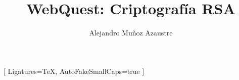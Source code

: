 \usepackage{fontspec}

\setmainfont{Times New Roman}[
  Ligatures=TeX,
  AutoFakeSmallCaps=true
]

\setmonofont{Courier New}

\usepackage[
  left=2.5cm,
  right=2.5cm,
  top=2.5cm,
  bottom=2.5cm
]{geometry}

\setlength{\headheight}{15pt}

\usepackage{setspace}
\onehalfspacing
\raggedbottom

\setlength{\parindent}{1.25cm}
\setlength{\parskip}{10pt}

\usepackage{graphicx}
\usepackage{caption}
\usepackage{float}
\usepackage{longtable}
\usepackage{array}
\usepackage{booktabs}
\usepackage[table]{xcolor}
\usepackage{tabularx}
\usepackage{multirow}
\usepackage{ragged2e}
\usepackage[most]{tcolorbox}
\usepackage{pgfplots}
\pgfplotsset{compat=1.18}




\title{WebQuest: Criptografía RSA} %
\author{Alejandro Muñoz Azaustre}

\makeatletter
\let\elTitulo\@title
\let\elAutor\@author
\makeatother
\usepackage{titlesec}

\usepackage{fancyhdr}
\usepackage{emptypage}
\usepackage{tikz}
\usetikzlibrary{arrows.meta}


